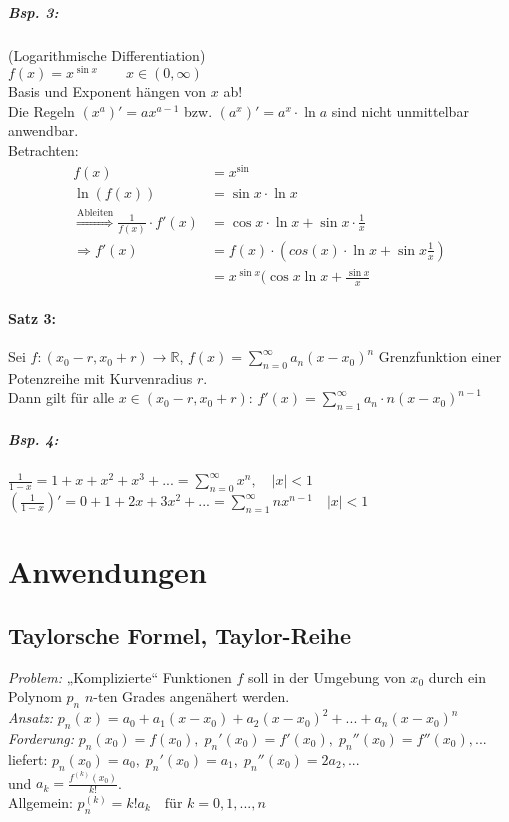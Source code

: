 \subparagraph{Bsp. 3:} (Logarithmische Differentiation)\\
$f(x)=x^{\sin x} \qquad x \in (0,\infty)$\\
Basis und Exponent hängen von $x$ ab!\\
Die Regeln $(x^a)'=a x^{a-1}$ bzw. $(a^x)'=a^x\cdot \ln a$ sind nicht unmittelbar anwendbar.\\
Betrachten: 
\begin{align*}
f(x)&= x^{\sin} \\
\ln(f(x))&=\sin x \cdot \ln x\\
\overset{\text{Ableiten}}{\Longrightarrow} \frac{1}{f(x)}\cdot f'(x)&=\cos x \cdot \ln x + \sin x \cdot \frac{1}{x}\\
\Rightarrow f'(x)&= f(x) \cdot (cos(x)\cdot \ln x + \sin x \frac{1}{x})\\
&= x^{\sin x} (\cos x \ln x + \frac{\sin x}{x}
\end{align*}

\paragraph{Satz 3:} Sei $f: (x_0-r, x_0+r) \to \mathbb{R}$, $f(x)=\sum_{n=0}^\infty a_n (x-x_0)^n$ Grenzfunktion einer Potenzreihe mit Kurvenradius $r$.\\
Dann gilt für alle $x \in (x_0-r, x_0+r)$: $f'(x) = \sum_{n=1}^\infty a_n \cdot n (x-x_0)^{n-1}$

\subparagraph{Bsp. 4:} $\frac{1}{1-x}=1+x+x^2+x^3+...= \sum_{n=0}^\infty x^n, \quad |x|<1$\\
$\left(\frac{1}{1-x}\right)' = 0+1+2x+3x^2+...=\sum_{n=1}^\infty n x^{n-1} \quad |x| <1$

\section{Anwendungen}
\subsection{Taylorsche Formel, Taylor-Reihe}

\emph{Problem:} „Komplizierte“ Funktionen $f$ soll in der Umgebung von $x_0$ durch ein Polynom $p_n$ $n$-ten Grades angenähert werden.\\
\emph{Ansatz:} $p_n(x)=a_0 + a_1 (x-x_0) + a_2(x-x_0)^2+...+ a_n (x-x_0)^n$\\
\emph{Forderung:} $p_n(x_0)= f(x_0), \; p_n'(x_0)=f'(x_0), \; p_n''(x_0)=f''(x_0), ...$\\
liefert: $p_n(x_0)=a_0, \; p_n'(x_0)=a_1, \; p_n''(x_0)=2a_2, ...$\\
und $a_k=\frac{f^{(k)}(x_0)}{k!}$.\\
Allgemein: $\boxed{p^{(k)}_n = k! a_k} \quad \text{für }k=0,1,...,n$
